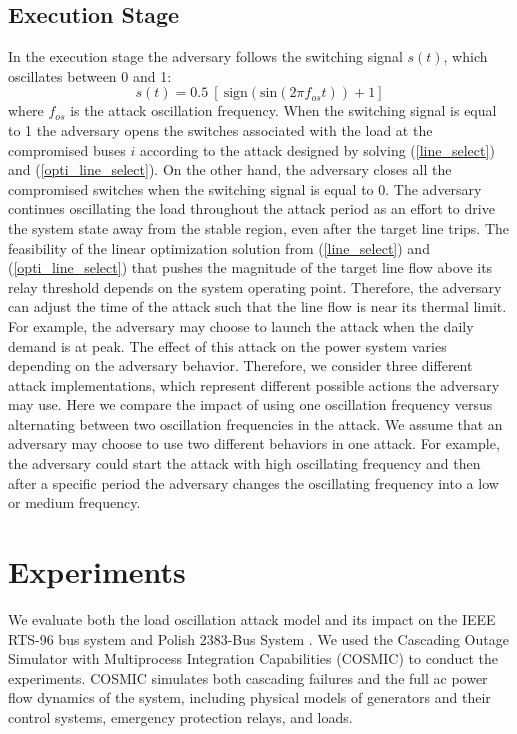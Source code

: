 \documentclass[journal]{IEEEtran}
\begin{document}
\subsection{Execution Stage}
In the execution stage the adversary follows the switching signal $s(t)$, which oscillates between 0 and 1: 
\begin{equation}
\label{switch}
s(t) = 0.5~[~\text{sign}(\text{sin}(2\pi f_{os}t))+1] 
\end{equation}
where $ f_{os} $ is the attack oscillation frequency. When the switching signal is equal to 1 the adversary opens the switches associated with the load at the compromised buses $i$ according to the attack designed by solving (\ref{line_select}) and (\ref{opti_line_select}). On the other hand, the adversary closes all the compromised switches when the switching signal is equal to 0. The adversary continues oscillating the load throughout the attack period as an effort to drive the system state away from the stable region, even after the target line trips. The feasibility of the linear optimization solution from (\ref{line_select}) and (\ref{opti_line_select}) that pushes the magnitude of the target line flow above its relay threshold depends on the system operating point. Therefore, the adversary can adjust the time of the attack such that the line flow is near its thermal limit. For example, the adversary may choose to launch the attack when the daily demand is at peak.
The effect of this attack on the power system varies depending on the adversary behavior. Therefore, we consider three different attack implementations, which represent different possible actions the adversary may use. Here we compare the impact of using one oscillation frequency versus alternating between two oscillation frequencies in the attack. We assume that an adversary may choose to use two different behaviors in one attack. For example, the adversary could start the attack with high oscillating frequency and then after a specific period the adversary changes the oscillating frequency into a low or medium frequency. 











 


\section{Experiments} 
We evaluate both the load oscillation attack model and its impact on the IEEE RTS-96 bus system \cite{RTS96} and Polish 2383-Bus System \cite{poland}. We used the Cascading Outage Simulator with Multiprocess Integration Capabilities (COSMIC) \cite{COSMIC} to conduct the experiments. COSMIC simulates both cascading failures and the full ac power flow dynamics of the system, including physical models of generators and their control systems, emergency protection relays, and loads. 
\end{document}
